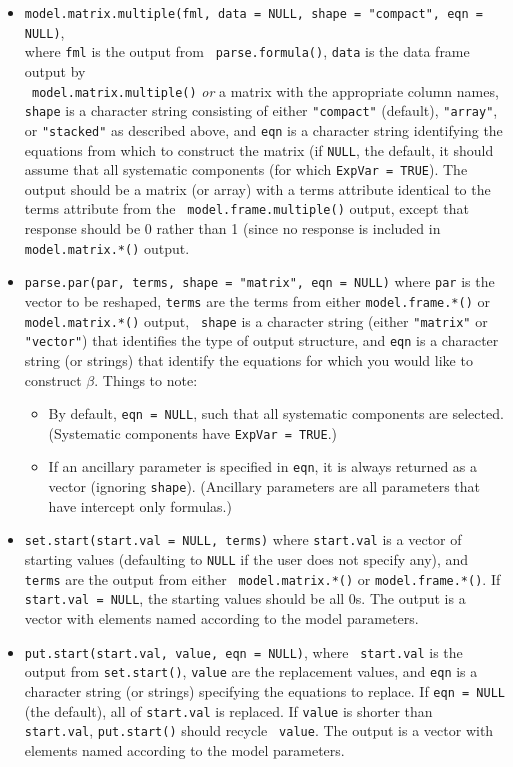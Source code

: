 \documentclass[oneside,letterpaper,12pt]{article}
\begin{document}
\begin{itemize}
\item {\tt model.matrix.multiple(fml, data = NULL, shape = "compact",
eqn = NULL)}, \\where {\tt fml} is the output from {\tt
parse.formula()}, {\tt data} is the data frame output by \\{\tt
model.matrix.multiple()} \emph{or} a matrix with the appropriate
column names, {\tt shape} is a character string consisting of either
{\tt "compact"} (default), {\tt "array"}, or {\tt "stacked"} as
described above, and {\tt eqn} is a character string identifying the
equations from which to construct the matrix (if {\tt NULL}, the
default, it should assume that all systematic components (for which
{\tt ExpVar = TRUE}).  The output should be a matrix (or array) with a
terms attribute identical to the terms attribute from the {\tt
model.frame.multiple()} output, except that response should be 0
rather than 1 (since no response is included in {\tt model.matrix.*()}
output.

\item {\tt parse.par(par, terms, shape = "matrix", eqn = NULL)} where
{\tt par} is the vector to be reshaped, {\tt terms} are the terms from
either {\tt model.frame.*()} or {\tt model.matrix.*()} output, {\tt
shape} is a character string (either {\tt "matrix"} or {\tt "vector"})
that identifies the type of output structure, and {\tt eqn} is a
character string (or strings) that identify the equations for which
you would like to construct $\beta$.  Things to note:  

\begin{itemize}
\item By default, {\tt eqn = NULL}, such that all systematic
components are selected.  (Systematic components have {\tt ExpVar =
TRUE}.)  

\item If an ancillary parameter is specified in {\tt eqn}, it is
always returned as a vector (ignoring {\tt shape}).  (Ancillary
parameters are all parameters that have intercept only formulas.)  
\end{itemize}  

\item {\tt set.start(start.val = NULL, terms)} where {\tt start.val}
is a vector of starting values (defaulting to {\tt NULL} if the user
does not specify any), and {\tt terms} are the output from either {\tt
model.matrix.*()} or {\tt model.frame.*()}.  If {\tt start.val = NULL},
the starting values should be all 0s.  The output is a vector with
elements named according to the model parameters.  

\item {\tt put.start(start.val, value, eqn = NULL)}, where {\tt
start.val} is the output from {\tt set.start()}, {\tt value} are the
replacement values, and {\tt eqn} is a character string (or strings)
specifying the equations to replace.  If {\tt eqn = NULL} (the
default), all of {\tt start.val} is replaced.  If {\tt value} is
shorter than {\tt start.val}, {\tt put.start()} should recycle {\tt
value}.  The output is a vector with elements named according to the
model parameters.  

\end{itemize} 
\end{document}
